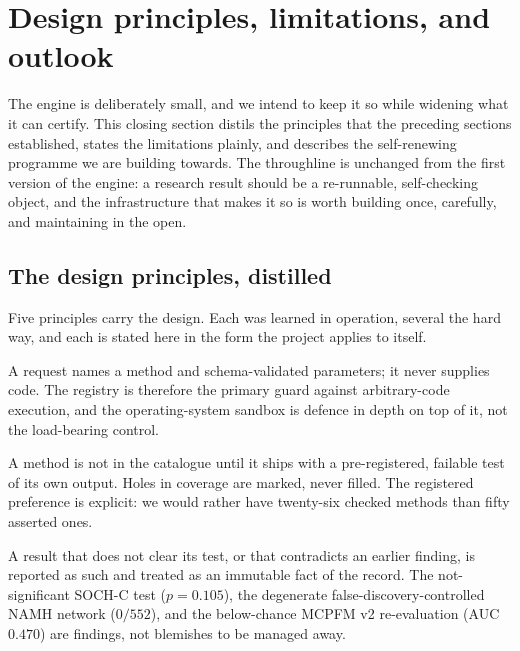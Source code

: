 \section{Design principles, limitations, and outlook}
\label{sec:outlook}

The engine is deliberately small, and we intend to keep it so while widening what
it can certify. This closing section distils the principles that the preceding
sections established, states the limitations plainly, and describes the
self-renewing programme we are building towards. The throughline is unchanged
from the first version of the engine: a research result should be a re-runnable,
self-checking object, and the infrastructure that makes it so is worth building
once, carefully, and maintaining in the open.

\subsection{The design principles, distilled}

Five principles carry the design. Each was learned in operation, several the hard
way, and each is stated here in the form the project applies to itself.

\begin{principle}
A request names a method and schema-validated parameters; it never supplies code.
The registry is therefore the primary guard against arbitrary-code execution, and
the operating-system sandbox is defence in depth on top of it, not the
load-bearing control.
\end{principle}

\begin{principle}
A method is not in the catalogue until it ships with a pre-registered, failable
test of its own output. Holes in coverage are marked, never filled. The registered
preference is explicit: we would rather have twenty-six checked methods than
fifty asserted ones.
\end{principle}

\begin{principle}
A result that does not clear its test, or that contradicts an earlier finding, is
reported as such and treated as an immutable fact of the record. The
not-significant SOCH-C test ($p=0.105$), the degenerate false-discovery-controlled
NAMH network ($0/552$), and the below-chance MCPFM v2 re-evaluation (AUC $0.470$)
are findings, not blemishes to be managed away.
\end{principle}

